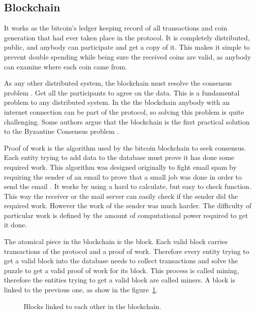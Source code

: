 \subsection{Blockchain} \label{subsec:Blockchain}
It works as the bitcoin's ledger keeping record of all transactions and coin
  generation that had ever taken place in the protocol.
It is completely distributed, public, and anybody can participate and get a
  copy of it.
This makes it simple to prevent double spending while being sure the received
  coins are valid, as anybody can examine where each coin came from.

As any other distributed system, the blockchain must resolve the consensus
  problem \cite{fischer1983consensus}. Get all the participants to agree on
  the data. This is a fundamental problem to any distributed system. In the
  the blockchain anybody with an internet connection can be part of the
  protocol, so solving this problem is quite challenging. Some authors argue
  that the blockchain is the first practical solution to the Byzantine Consensus
  problem \cite{miller2014anonymous,sun2014solving}.

Proof of work is the algorithm used by the bitcoin blockchain to seek
  consensus. Each entity trying to add data to the database must prove it
  has done some required work. This algorithm was designed originally to fight
  email spam by requiring the sender of an email to prove that a small job was
  done in order to send the email \cite{dwork1992pricing}.
It works by using a hard to calculate, but easy to check function. This
  way the receiver or the mail server can easily check if the sender did
  the required work.
However the work of the sender was much harder.
The difficulty of particular work is defined by the amount of computational
  power required to get it done.

The atomical piece in the blockchain is the block. Each valid block carries
  transactions of the protocol and a proof of work. Therefore every entity
  trying to get a valid block into the database needs to collect transactions
  and solve the puzzle to get a valid proof of work for its block.
This process is called mining, therefore the entities trying to get a valid
  block are called miners. A block is linked to the previous one, as show in the
  figure~\ref{fig:block_links}.

\begin{figure}
	\centering
	\def\svgwidth{\columnwidth}
	
	\caption{Blocks linked to each other in the blockchain.}
	\label{fig:block_links}
\end{figure}


